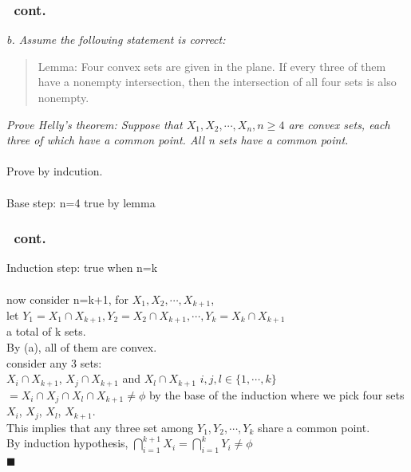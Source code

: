 \documentclass[a4paper]{beamer}
\begin{document}
\begin{frame}[t]
  \frametitle{\subsecname\ cont.}
  \textit{b. Assume the following statement is correct:}\\ 
  \begin{quote} 
  Lemma: Four convex sets are given in the plane. If every three of them have a nonempty intersection, then the intersection of all four sets is also nonempty.
  \end{quote}
  \textit{Prove Helly's theorem: Suppose that $X_1, X_2, \cdots, X_n, n\geq4$ are convex sets, each three of which have a common point. All n sets have a common point.}\\ 
  $\;$\\
\alert{Prove by indcution.}\\ 
$\;$\\
Base step: n=4 true by lemma
\end{frame}

\begin{frame}[t]
  \frametitle{\subsecname\ cont.}
Induction step: true when n=k\\  $\;$\\
now consider n=k+1, for $X_1,X_2,\cdots,X_{k+1}$,\\ 
let $Y_1=X_1\cap X_{k+1},Y_2=X_2\cap X_{k+1},\cdots,Y_k=X_k\cap X_{k+1}$\\
\hfill a total of k sets.\\ 
By (a), all of them are convex. \\ 
consider any 3 sets:\\
$X_i \cap X_{k+1}$, $X_j \cap X_{k+1}$ and $X_l \cap X_{k+1}$ $i, j, l \in \{1,\cdots,k\} $ 
$=X_i \cap X_{j}\cap X_{l}\cap X_{k+1} \neq \phi$ by the base of the induction where we pick four sets $X_i$, $X_{j}$, $X_{l}$, $X_{k+1}$.\\ 
This implies that any three set among $Y_1, Y_2, \cdots, Y_k$ share a common point.\\ 
By induction hypothesis,
$\bigcap_{i=1}^{k+1}X_i=\bigcap_{i=1}^{k}Y_i\neq\phi$ \\
\hfill $\blacksquare$
\end{frame}
\end{document}

